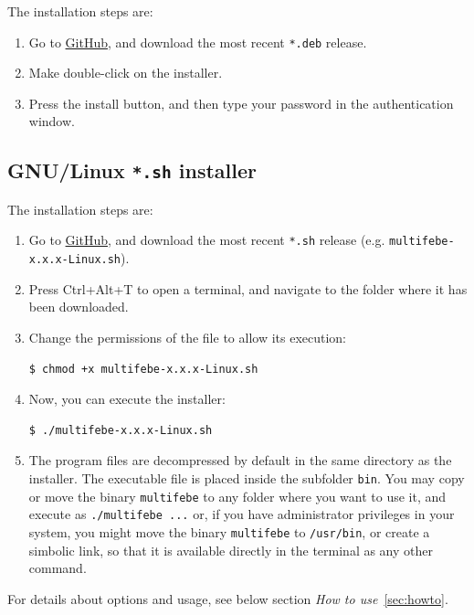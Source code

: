 \documentclass[a4paper,fleqn]{book}
\begin{document}
The installation steps are:
\begin{enumerate}
    \item Go to \href{https://github.com/mmc-siani-es/MultiFEBE/releases}{GitHub}, and download the most recent \texttt{*.deb} release.
    \item Make double-click on the installer.
    \item Press the install button, and then type your password in the authentication window.   
\end{enumerate}

\subsection{GNU/Linux \texttt{*.sh} installer}

The installation steps are:
\begin{enumerate}
    \item Go to \href{https://github.com/mmc-siani-es/MultiFEBE/releases}{GitHub}, and download the most recent \texttt{*.sh} release (e.g. \texttt{multifebe-x.x.x-Linux.sh}).
    \item Press Ctrl+Alt+T to open a terminal, and navigate to the folder where it has been downloaded.
    \item Change the permissions of the file to allow its execution:
\begin{Verbatim}[frame=single, fontsize=\small]
$ chmod +x multifebe-x.x.x-Linux.sh
\end{Verbatim}
    \item Now, you can execute the installer:
\begin{Verbatim}[frame=single, fontsize=\small]
$ ./multifebe-x.x.x-Linux.sh
\end{Verbatim}
    \item The program files are decompressed by default in the same directory as the installer. The executable file is placed inside the subfolder \texttt{bin}. You may copy or move the binary \texttt{multifebe} to any folder where you want to use it, and execute as \verb!./!\texttt{multifebe ...} or, if you have administrator privileges in your system, you might move the binary \texttt{multifebe} to \texttt{/usr/bin}, or create a simbolic link, so that it is available directly in the terminal as any other command. 
\end{enumerate}

For details about options and usage, see below section \textit{How to use}~\ref{sec:howto}.
\end{document}
